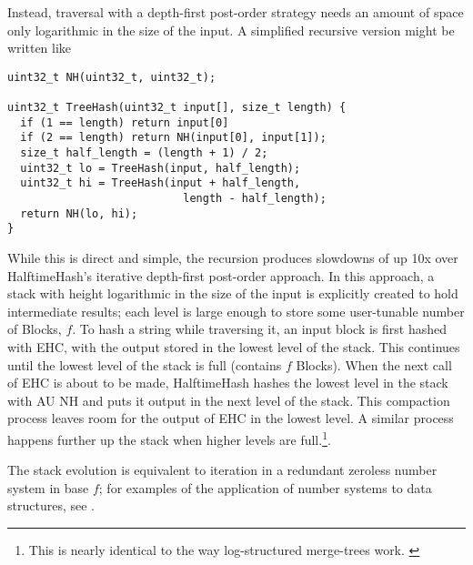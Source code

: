 \documentclass[sigconf, nonacm]{acmart}
\begin{document}
Instead, traversal with a depth-first post-order strategy needs an amount of space only logarithmic in the size of the input.
A simplified recursive version might be written like

\begin{lstlisting}
uint32_t NH(uint32_t, uint32_t);

uint32_t TreeHash(uint32_t input[], size_t length) {
  if (1 == length) return input[0]
  if (2 == length) return NH(input[0], input[1]);
  size_t half_length = (length + 1) / 2;
  uint32_t lo = TreeHash(input, half_length);
  uint32_t hi = TreeHash(input + half_length,
                           length - half_length);
  return NH(lo, hi);
}
\end{lstlisting}

While this is direct and simple, the recursion produces slowdowns of up 10x over HalftimeHash's iterative depth-first post-order approach.
In this approach, a stack with height logarithmic in the size of the input is explicitly created to hold intermediate results; each level is large enough to store some user-tunable number of Blocks, $f$.
To hash a string while traversing it, an input block is first hashed with EHC, with the output stored in the lowest level of the stack.
This continues until the lowest level of the stack is full (contains $f$ Blocks).
When the next call of EHC is about to be made, HalftimeHash hashes the lowest level in the stack with AU NH and puts it output in the next level of the stack.
This compaction process leaves room for the output of EHC in the lowest level.
A similar process happens further up the stack when higher levels are full.\footnote{This is nearly identical to the way log-structured merge-trees work. \cite{lsm-survey}}.

The stack evolution is equivalent to iteration in a redundant zeroless number system in base $f$; for examples of the application of number systems to data structures, see \cite{redundant-zeroless}.

\end{document}
